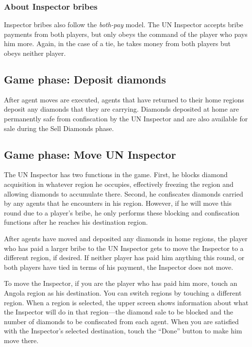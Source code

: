 \documentclass[8pt]{extbook}
\begin{document}
\subsubsection{About Inspector bribes}
Inspector bribes also follow the {\it both-pay} model.  The UN Inspector accepts bribe payments from both players, but only obeys the command of the player who pays him more.  Again, in the case of a tie, he takes money from both players but obeys neither player.

\subsection{Game phase:  Deposit diamonds}
\label{sec:depositPhase}

After agent moves are executed, agents that have returned to their home regions deposit any diamonds that they are carrying.  Diamonds deposited at home are permanently safe from confiscation by the UN Inspector and are also available for sale during the Sell Diamonds phase.

\subsection{Game phase:  Move UN Inspector}
\label{sec:inspectorPhase}

The UN Inspector has two functions in the game.  First, he blocks diamond acquisition in whatever region he occupies, effectively freezing the region and allowing diamonds to accumulate there.  Second, he confiscates diamonds carried by any agents that he encounters in his region.  However, if he will move this round due to a player's bribe, he only performs these blocking and confiscation functions after he reaches his destination region.

After agents have moved and deposited any diamonds in home regions, the player who has paid a larger bribe to the UN Inspector gets to move the Inspector to a different region, if desired.  If neither player has paid him anything this round, or both players have tied in terms of his payment, the Inspector does not move.

To move the Inspector, if you are the player who has paid him more, touch an Angola region as his destination.  You can switch regions by touching a different region.  When a region is selected, the upper screen shows information about what the Inspector will do in that region---the diamond sale to be blocked and the number of diamonds to be confiscated from each agent.  When you are satisfied with the Inspector's selected destination, touch the ``Done'' button to make him move there.
\end{document}
